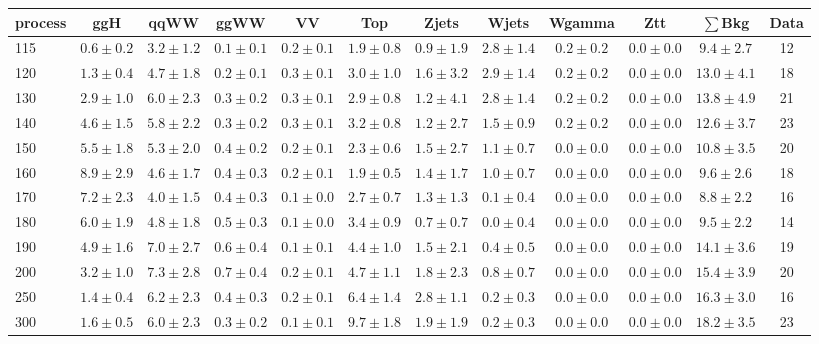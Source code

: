 \begin{table}
{\footnotesize
 \begin{center}
 \begin{tabular}{l c c c c c c c c c c c }
 \hline
 process & ggH & qqWW & ggWW & VV & Top & Zjets & Wjets & Wgamma & Ztt & $\sum$Bkg & Data \\
 \hline
115 & $0.6\pm0.2$ & $3.2\pm1.2$ & $0.1\pm0.1$ & $0.2\pm0.1$ & $1.9\pm0.8$ & $0.9\pm1.9$ & $2.8\pm1.4$ & $0.2\pm0.2$ & $0.0\pm0.0$ & $9.4\pm2.7$ & 12 \\
120 & $1.3\pm0.4$ & $4.7\pm1.8$ & $0.2\pm0.1$ & $0.3\pm0.1$ & $3.0\pm1.0$ & $1.6\pm3.2$ & $2.9\pm1.4$ & $0.2\pm0.2$ & $0.0\pm0.0$ & $13.0\pm4.1$ & 18 \\
130 & $2.9\pm1.0$ & $6.0\pm2.3$ & $0.3\pm0.2$ & $0.3\pm0.1$ & $2.9\pm0.8$ & $1.2\pm4.1$ & $2.8\pm1.4$ & $0.2\pm0.2$ & $0.0\pm0.0$ & $13.8\pm4.9$ & 21 \\
140 & $4.6\pm1.5$ & $5.8\pm2.2$ & $0.3\pm0.2$ & $0.3\pm0.1$ & $3.2\pm0.8$ & $1.2\pm2.7$ & $1.5\pm0.9$ & $0.2\pm0.2$ & $0.0\pm0.0$ & $12.6\pm3.7$ & 23 \\
150 & $5.5\pm1.8$ & $5.3\pm2.0$ & $0.4\pm0.2$ & $0.2\pm0.1$ & $2.3\pm0.6$ & $1.5\pm2.7$ & $1.1\pm0.7$ & $0.0\pm0.0$ & $0.0\pm0.0$ & $10.8\pm3.5$ & 20 \\
160 & $8.9\pm2.9$ & $4.6\pm1.7$ & $0.4\pm0.3$ & $0.2\pm0.1$ & $1.9\pm0.5$ & $1.4\pm1.7$ & $1.0\pm0.7$ & $0.0\pm0.0$ & $0.0\pm0.0$ & $9.6\pm2.6$ & 18 \\
170 & $7.2\pm2.3$ & $4.0\pm1.5$ & $0.4\pm0.3$ & $0.1\pm0.0$ & $2.7\pm0.7$ & $1.3\pm1.3$ & $0.1\pm0.4$ & $0.0\pm0.0$ & $0.0\pm0.0$ & $8.8\pm2.2$ & 16 \\
180 & $6.0\pm1.9$ & $4.8\pm1.8$ & $0.5\pm0.3$ & $0.1\pm0.0$ & $3.4\pm0.9$ & $0.7\pm0.7$ & $0.0\pm0.4$ & $0.0\pm0.0$ & $0.0\pm0.0$ & $9.5\pm2.2$ & 14 \\
190 & $4.9\pm1.6$ & $7.0\pm2.7$ & $0.6\pm0.4$ & $0.1\pm0.1$ & $4.4\pm1.0$ & $1.5\pm2.1$ & $0.4\pm0.5$ & $0.0\pm0.0$ & $0.0\pm0.0$ & $14.1\pm3.6$ & 19 \\
200 & $3.2\pm1.0$ & $7.3\pm2.8$ & $0.7\pm0.4$ & $0.2\pm0.1$ & $4.7\pm1.1$ & $1.8\pm2.3$ & $0.8\pm0.7$ & $0.0\pm0.0$ & $0.0\pm0.0$ & $15.4\pm3.9$ & 20 \\
250 & $1.4\pm0.4$ & $6.2\pm2.3$ & $0.4\pm0.3$ & $0.2\pm0.1$ & $6.4\pm1.4$ & $2.8\pm1.1$ & $0.2\pm0.3$ & $0.0\pm0.0$ & $0.0\pm0.0$ & $16.3\pm3.0$ & 16 \\
300 & $1.6\pm0.5$ & $6.0\pm2.3$ & $0.3\pm0.2$ & $0.1\pm0.1$ & $9.7\pm1.8$ & $1.9\pm1.9$ & $0.2\pm0.3$ & $0.0\pm0.0$ & $0.0\pm0.0$ & $18.2\pm3.5$ & 23 \\

\end{tabular}
\end{center}}
\end{table}
